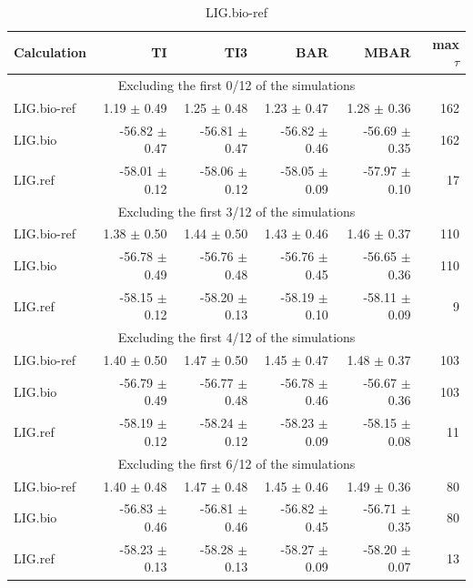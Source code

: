 \documentclass[journal=jctcce,manuscript=article,hyperref=false]{achemso}
\title{}
\begin{document}
\listoffigures
\listoftables




\clearpage
\pagebreak
\begin{table}
\caption{LIG.bio-ref}
{\small
\begin{tabular}{l r r r r r}
\hline
                             Calculation &                 TI &                TI3 &                BAR &               MBAR & max $\tau$\\
\hline\multicolumn{6}{c}{Excluding the first 0/12 of the simulations} \\
                             LIG.bio-ref &    1.19 $\pm$    0.49 &    1.25 $\pm$    0.48 &    1.23 $\pm$    0.47 &    1.28 $\pm$    0.36 &     162 \\
                                 LIG.bio &  -56.82 $\pm$    0.47 &  -56.81 $\pm$    0.47 &  -56.82 $\pm$    0.46 &  -56.69 $\pm$    0.35 &     162 \\
                                 LIG.ref &  -58.01 $\pm$    0.12 &  -58.06 $\pm$    0.12 &  -58.05 $\pm$    0.09 &  -57.97 $\pm$    0.10 &      17 \\
\multicolumn{6}{c}{Excluding the first 3/12 of the simulations} \\
                             LIG.bio-ref &    1.38 $\pm$    0.50 &    1.44 $\pm$    0.50 &    1.43 $\pm$    0.46 &    1.46 $\pm$    0.37 &     110 \\
                                 LIG.bio &  -56.78 $\pm$    0.49 &  -56.76 $\pm$    0.48 &  -56.76 $\pm$    0.45 &  -56.65 $\pm$    0.36 &     110 \\
                                 LIG.ref &  -58.15 $\pm$    0.12 &  -58.20 $\pm$    0.13 &  -58.19 $\pm$    0.10 &  -58.11 $\pm$    0.09 &       9 \\
\multicolumn{6}{c}{Excluding the first 4/12 of the simulations} \\
                             LIG.bio-ref &    1.40 $\pm$    0.50 &    1.47 $\pm$    0.50 &    1.45 $\pm$    0.47 &    1.48 $\pm$    0.37 &     103 \\
                                 LIG.bio &  -56.79 $\pm$    0.49 &  -56.77 $\pm$    0.48 &  -56.78 $\pm$    0.46 &  -56.67 $\pm$    0.36 &     103 \\
                                 LIG.ref &  -58.19 $\pm$    0.12 &  -58.24 $\pm$    0.12 &  -58.23 $\pm$    0.09 &  -58.15 $\pm$    0.08 &      11 \\
\multicolumn{6}{c}{Excluding the first 6/12 of the simulations} \\
                             LIG.bio-ref &    1.40 $\pm$    0.48 &    1.47 $\pm$    0.48 &    1.45 $\pm$    0.46 &    1.49 $\pm$    0.36 &      80 \\
                                 LIG.bio &  -56.83 $\pm$    0.46 &  -56.81 $\pm$    0.46 &  -56.82 $\pm$    0.45 &  -56.71 $\pm$    0.35 &      80 \\
                                 LIG.ref &  -58.23 $\pm$    0.13 &  -58.28 $\pm$    0.13 &  -58.27 $\pm$    0.09 &  -58.20 $\pm$    0.07 &      13 \\

\hline
\end{tabular}
}
\end{table}
\end{document}
